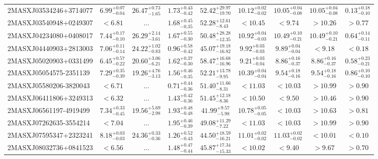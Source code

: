 \documentclass[onecolumn]{mn2e}
\begin{document}
{\begin{center}
\begin{longtable}{lcccccccc}
2MASXJ03534246+3714077 & $6.99_{-0.04}^{+0.07}$ & $26.47_{-1.65}^{+0.73}$ & $1.73_{-0.42}^{+0.43}$ &$52.42_{-19.70}^{+29.97}$ & $10.12_{-0.02}^{+0.02}$ & $10.05_{-0.08}^{+0.04}$ & $10.05_{-0.08}^{+0.04}$ & $0.13_{-0.10}^{+0.18}$ \\
2MASXJ03540948+0249307 & $<6.81$ & ... & $1.68_{-0.35}^{+0.45}$ &$52.28_{-8.43}^{+12.61}$ & $<10.45$ & $<9.74$ & $>10.26$ & $>0.77$ \\
2MASXJ04234080+0408017 & $7.44_{-0.10}^{+0.17}$ & $26.29_{-3.61}^{+2.14}$ & $1.67_{-0.30}^{+0.55}$ &$50.48_{-12.35}^{+28.28}$ & $10.92_{-0.03}^{+0.04}$ & $10.49_{-0.21}^{+0.10}$ & $10.49_{-0.21}^{+0.10}$ & $0.64_{-0.11}^{+0.14}$ \\
2MASXJ04440903+2813003 & $7.06_{-0.14}^{+0.11}$ & $24.22_{-0.83}^{+1.02}$ & $0.96_{-0.42}^{+0.58}$ &$45.07_{-16.82}^{+19.18}$ & $9.92_{-0.03}^{+0.03}$ & $9.89_{-0.04}^{+0.04}$ & $<9.18$ & $<0.18$ \\
2MASXJ05020903+0331499 & $6.45_{-0.22}^{+0.57}$ & $20.60_{-6.21}^{+3.06}$ & $1.62_{-0.30}^{+0.37}$ &$58.47_{-16.96}^{+16.68}$ & $9.21_{-0.04}^{+0.03}$ & $8.86_{-0.37}^{+0.16}$ & $8.86_{-0.37}^{+0.16}$ & $0.58_{-0.21}^{+0.23}$ \\
2MASXJ05054575-2351139 & $7.29_{-0.39}^{+0.35}$ & $19.26_{-3.13}^{+4.76}$ & $1.56_{-0.35}^{+0.46}$ &$52.21_{-9.95}^{+13.78}$ & $10.39_{-0.04}^{+0.04}$ & $9.54_{-0.16}^{+0.18}$ & $9.54_{-0.16}^{+0.18}$ & $0.86_{-0.10}^{+0.10}$ \\
2MASXJ05580206-3820043 & $<6.71$ & ... & $0.71_{-0.36}^{+0.44}$ &$51.40_{-8.31}^{+11.66}$ & $<11.03$ & $<10.03$ & $>10.99$ & $>0.90$ \\
2MASXJ06411806+3249313 & $<6.32$ & ... & $1.43_{-0.36}^{+0.42}$ &$51.45_{-8.36}^{+12.18}$ & $<10.50$ & $<9.50$ & $>10.46$ & $>0.90$ \\
2MASXJ06561197-4919499 & $7.34_{-0.45}^{+0.33}$ & $19.56_{-2.98}^{+5.69}$ & $1.93_{-0.48}^{+0.48}$ &$41.99_{-5.98}^{+9.57}$ & $10.78_{-0.05}^{+0.05}$ & $<10.03$ & $>10.63$ & $>0.81$ \\
2MASXJ07262635-3554214 & $<7.04$ & ... & $1.95_{-0.39}^{+0.46}$ &$49.08_{-7.22}^{+11.29}$ & $<11.03$ & $<10.03$ & $>10.99$ & $>0.90$ \\
2MASXJ07595347+2323241 & $8.18_{-0.03}^{+0.03}$ & $24.36_{-0.36}^{+0.33}$ & $1.26_{-0.43}^{+0.52}$ &$44.50_{-16.21}^{+18.59}$ & $11.01_{-0.02}^{+0.02}$ & $11.03_{-0.02}^{+0.02}$ & $<10.01$ & $<0.10$ \\
2MASXJ08032736+0841523 & $<6.56$ & ... & $1.48_{-0.44}^{+0.47}$ &$45.87_{-15.33}^{+17.34}$ & $<10.02$ & $<9.40$ & $>9.67$ & $>0.70$ \\

\end{longtable}
\end{center}}
\end{document}
